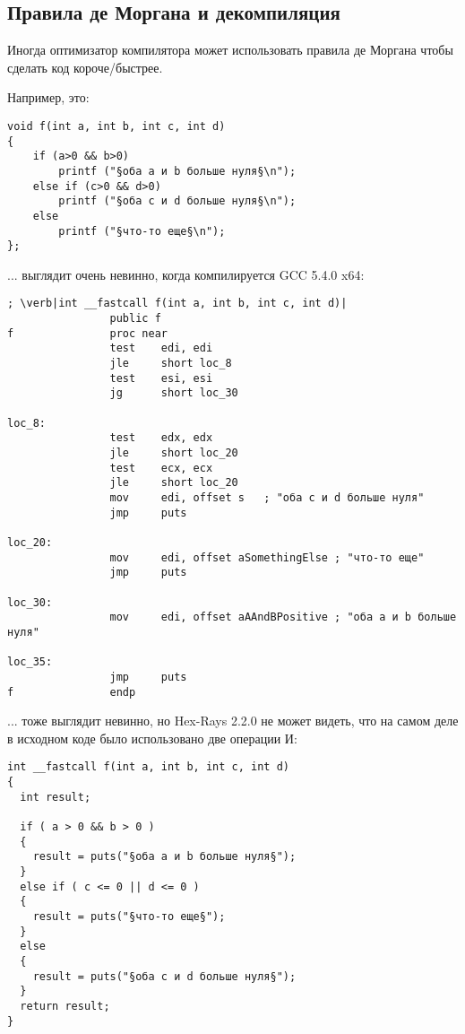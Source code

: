 \subsection{Правила де Моргана и декомпиляция}

Иногда оптимизатор компилятора может использовать правила де Моргана чтобы сделать код короче/быстрее.

Например, это:

\begin{lstlisting}[style=customc]
void f(int a, int b, int c, int d)
{
	if (a>0 && b>0)
		printf ("§оба a и b больше нуля§\n");
	else if (c>0 && d>0)
		printf ("§оба c и d больше нуля§\n");
	else
		printf ("§что-то еще§\n");
};
\end{lstlisting}

... выглядит очень невинно, когда компилируется GCC 5.4.0 x64:

\begin{lstlisting}[style=customasmx86]
; \verb|int __fastcall f(int a, int b, int c, int d)|
                public f
f               proc near
                test    edi, edi
                jle     short loc_8
                test    esi, esi
                jg      short loc_30

loc_8:
                test    edx, edx
                jle     short loc_20
                test    ecx, ecx
                jle     short loc_20
                mov     edi, offset s   ; "оба c и d больше нуля"
                jmp     puts

loc_20:
                mov     edi, offset aSomethingElse ; "что-то еще"
                jmp     puts

loc_30:
                mov     edi, offset aAAndBPositive ; "оба a и b больше нуля"

loc_35:
                jmp     puts
f               endp
\end{lstlisting}

... тоже выглядит невинно, но Hex-Rays 2.2.0 не может видеть, что на самом деле в исходном коде было использовано две операции И:

\begin{lstlisting}[style=customc]
int __fastcall f(int a, int b, int c, int d)
{
  int result;

  if ( a > 0 && b > 0 )
  {
    result = puts("§оба a и b больше нуля§");
  }
  else if ( c <= 0 || d <= 0 )
  {
    result = puts("§что-то еще§");
  }
  else
  {
    result = puts("§оба c и d больше нуля§");
  }
  return result;
}
\end{lstlisting}

